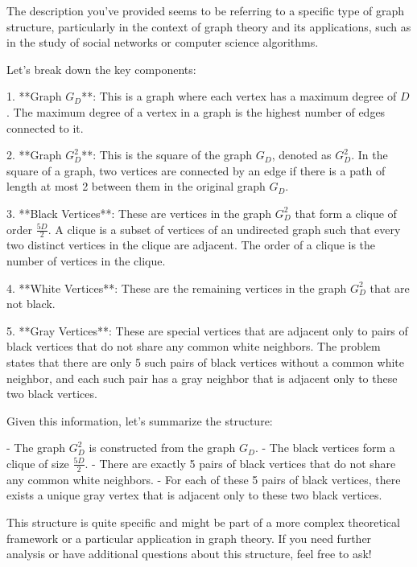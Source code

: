 The description you've provided seems to be referring to a specific type of graph structure, particularly in the context of graph theory and its applications, such as in the study of social networks or computer science algorithms.

Let's break down the key components:

1. **Graph \( G_D \)**: This is a graph where each vertex has a maximum degree of \( D \). The maximum degree of a vertex in a graph is the highest number of edges connected to it.

2. **Graph \( G_D^2 \)**: This is the square of the graph \( G_D \), denoted as \( G_D^2 \). In the square of a graph, two vertices are connected by an edge if there is a path of length at most 2 between them in the original graph \( G_D \).

3. **Black Vertices**: These are vertices in the graph \( G_D^2 \) that form a clique of order \( \frac{5D}{2} \). A clique is a subset of vertices of an undirected graph such that every two distinct vertices in the clique are adjacent. The order of a clique is the number of vertices in the clique.

4. **White Vertices**: These are the remaining vertices in the graph \( G_D^2 \) that are not black.

5. **Gray Vertices**: These are special vertices that are adjacent only to pairs of black vertices that do not share any common white neighbors. The problem states that there are only 5 such pairs of black vertices without a common white neighbor, and each such pair has a gray neighbor that is adjacent only to these two black vertices.

Given this information, let's summarize the structure:

- The graph \( G_D^2 \) is constructed from the graph \( G_D \).
- The black vertices form a clique of size \( \frac{5D}{2} \).
- There are exactly 5 pairs of black vertices that do not share any common white neighbors.
- For each of these 5 pairs of black vertices, there exists a unique gray vertex that is adjacent only to these two black vertices.

This structure is quite specific and might be part of a more complex theoretical framework or a particular application in graph theory. If you need further analysis or have additional questions about this structure, feel free to ask!